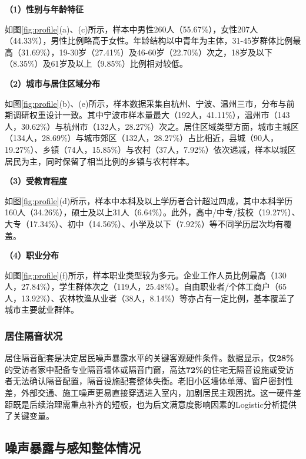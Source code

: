 \textbf{（1）性别与年龄特征}

如图\ref{fig:profile}(a)、(c)所示，样本中男性260人（55.67\%），女性207人（44.33\%），男性比例略高于女性。年龄结构以中青年为主体，31-45岁群体比例最高（31.69\%），19-30岁（27.41\%）及46-60岁（22.70\%）次之，18岁及以下（8.35\%）及61岁及以上（9.85\%）比例相对较低。

\textbf{（2）城市与居住区域分布}

如图\ref{fig:profile}(b)、(e)所示，样本数据采集自杭州、宁波、温州三市，分布与前期调研权重设计一致。其中宁波市样本量最大（192人，41.11\%），温州市（143人，30.62\%）与杭州市（132人，28.27\%）次之。居住区域类型方面，城市主城区（134人，28.69\%）与城市郊区（132人，28.27\%）占比相近，县城（90人，19.27\%）、乡镇（74人，15.85\%）与农村（37人，7.92\%）依次递减，样本以城区居民为主，同时保留了相当比例的乡镇与农村样本。

\textbf{（3）受教育程度}

如图\ref{fig:profile}(d)所示，样本中本科及以上学历者合计超过四成，其中本科学历160人（34.26\%），硕士及以上31人（6.64\%）。此外，高中/中专/技校（19.27\%）、大专（17.34\%）、初中（14.56\%）、小学及以下（7.92\%）等不同学历层次均有覆盖。

\textbf{（4）职业分布}

如图\ref{fig:profile}(f)所示，样本职业类型较为多元。企业工作人员比例最高（130人，27.84\%），学生群体次之（119人，25.48\%）。自由职业者/个体工商户（65人，13.92\%）、农林牧渔从业者（38人，8.14\%）等亦占有一定比例，基本覆盖了城市主要就业群体。

\subsubsection{居住隔音状况}


居住隔音配套是决定居民噪声暴露水平的关键客观硬件条件。数据显示，仅\textbf{28\%}的受访者家中配备专业隔音墙体或隔音门窗，高达\textbf{72\%}的住宅无隔音设施或受访者无法确认隔音配置，隔音设施配套整体失衡。老旧小区墙体单薄、窗户密封性差，外部交通、施工噪声更易直接穿透进入室内，加剧居民主观困扰。这一硬件差距既是后续治理需重点补齐的短板，也为后文满意度影响因素的Logistic分析提供了关键变量。

\subsection{噪声暴露与感知整体情况}


